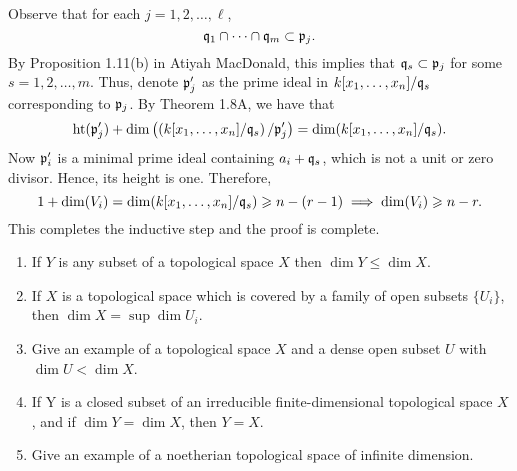 \documentclass[10pt]{amsart}
\begin{document}
\begin{solution}
{\begin{description}
        Observe that for each $j = 1, 2, \dots, {\ell}$, 
        \[
            \mathfrak{q}_1 \cap \cdots \cap \mathfrak{q}_{m} \subset \mathfrak{p}_j.
        \]
        By Proposition 1.11(b) in Atiyah MacDonald, this implies that 
        $\mathfrak{q}_s \subset \mathfrak{p}_j$ for some $s = 1, 2, \dots, m$. 
        Thus, denote $\mathfrak{p}'_j$ as the prime ideal in $k[x_1, \dots, x_n]/\mathfrak{q}_s$ 
        corresponding to $\mathfrak{p}_j$. 
        By Theorem 1.8A, we have that 
        \[
            \operatorname{\rm{ht}}(\mathfrak{p}'_j) + \operatorname{\rm{dim}}\left( \left(k[x_1, \dots, x_n]/\mathfrak{q}_s\right)/\mathfrak{p}'_j \right)
            =
            \operatorname{\rm{dim}}(k[x_1, \dots, x_n]/\mathfrak{q}_s).
        \]
        Now $\mathfrak{p}'_i$ is a minimal prime ideal containing $a_i + \mathfrak{q}_s$, which is not a unit
        or zero divisor. Hence, its height is one. Therefore, 
        \[
            1 + \operatorname{\rm{dim}}(V_i) = \operatorname{\rm{dim}}(k[x_1, \dots, x_n]/\mathfrak{q}_s) \geqslant n - (r - 1)
            \implies 
            \operatorname{\rm{dim}}(V_i) \geqslant n - r.
        \]
        This completes the inductive step and the proof is complete. 
    \end{description}}
\end{solution}

\begin{exercise}[1.10]
    \begin{enumerate}
        \item If $Y$ is any subset of a topological space $X$ then $\dim Y \leq \dim X$. 
        \item If $X$ is a topological space which is covered by a family of open
          subsets $\{U_{i}\}$, then $\dim X = \sup \dim U_i$.
        \item Give an example of a topological space $X$ and a dense open subset $U$
          with $\dim U < \dim X$. 
        \item If Y is a closed subset of an irreducible finite-dimensional topological space $X$, and if $\dim Y = \dim X$, then $Y= X$. 
        \item Give an example of a noetherian topological space of infinite dimension.  
    \end{enumerate}
\end{exercise}
\end{document}
